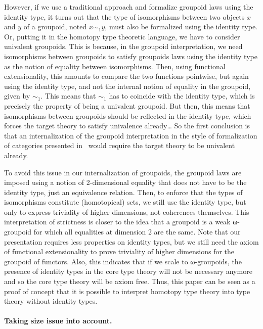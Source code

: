 However, if we use a traditional approach and formalize groupoid laws
using the identity type, it turns out that the type of isomorphisms
between two objects $x$ and $y$ of a groupoid, noted $x \sim_1 y$, must
also be formalized using the identity type. Or, putting it in the
homotopy type theoretic language, we have to consider univalent
groupoids.
%
This is because, in the groupoid interpretation, we need isomorphisms
between groupoids to satisfy groupoids laws using the identity
type as the notion of equality between isomorphisms. Then, using
functional extensionality, this amounts to compare the two functions
pointwise, but again using the identity type, and not the internal
notion of equality in the groupoid, given by $\sim_1$.
%
This means that $\sim_1$ has to coincide with the identity type, which
is precisely the property  of being a univalent groupoid.
%
But then, this means that isomorphisms between groupoids should be
reflected in the identity type, which forces the target theory to
satisfy univalence already\ldots
%
So the first conclusion is that an internalization of the groupoid
interpretation in the style of formalization of categories presented
in~\cite{hottbook} would require the target theory to be univalent already.
 
To avoid this issue in our internalization of groupoids, the groupoid
laws are imposed using a notion of 2-dimensional equality that does
not have to be the identity type, just an equivalence relation.
%
Then, to enforce that the types of isomorphisms constitute
(homotopical) sets, we still use the identity type, but only to
express triviality of higher dimensions, not coherences themselves.
%
This interpretation of strictness is closer to the idea that a
groupoid is a weak ω-groupoid for which all equalities at dimension 2
are the same.
%
%
Note that our presentation requires less properties on identity types,
but we still need the axiom of functional extensionality to prove
triviality of higher dimensions for the groupoid of functors.
%
Also, this indicates that if we scale to ω-groupoids, the presence of
identity types in the core type theory will
not be necessary anymore and so the core type theory will be axiom free.
%
Thus, this paper can be seen as a proof of concept that it is possible
to interpret homotopy type theory into type theory without identity
types.


\paragraph{\bf Taking size issue into account.}
%

